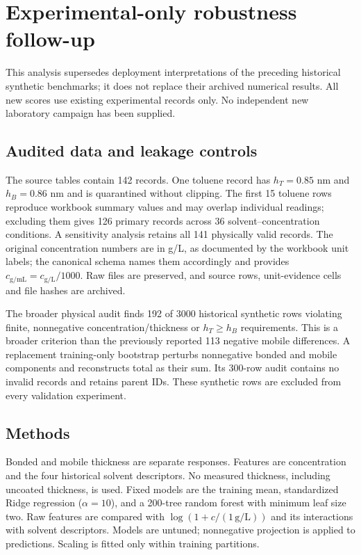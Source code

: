 \section{Experimental-only robustness follow-up}

\label{sec:robustness}

This analysis supersedes deployment interpretations of the preceding historical synthetic benchmarks; it does not replace their archived numerical results. All new scores use existing experimental records only. No independent new laboratory campaign has been supplied.

\subsection{Audited data and leakage controls}

The source tables contain 142 records. One toluene record has $h_T=0.85$ nm and $h_B=0.86$ nm and is quarantined without clipping. The first 15 toluene rows reproduce workbook summary values and may overlap individual readings; excluding them gives 126 primary records across 36 solvent--concentration conditions. A sensitivity analysis retains all 141 physically valid records. The original concentration numbers are in g/L, as documented by the workbook unit labels; the canonical schema names them accordingly and provides $c_{\mathrm{g/mL}}=c_{\mathrm{g/L}}/1000$. Raw files are preserved, and source rows, unit-evidence cells and file hashes are archived.

The broader physical audit finds 192 of 3000 historical synthetic rows violating finite, nonnegative concentration/thickness or $h_T\ge h_B$ requirements. This is a broader criterion than the previously reported 113 negative mobile differences. A replacement training-only bootstrap perturbs nonnegative bonded and mobile components and reconstructs total as their sum. Its 300-row audit contains no invalid records and retains parent IDs. These synthetic rows are excluded from every validation experiment.

\subsection{Methods}

Bonded and mobile thickness are separate responses. Features are concentration and the four historical solvent descriptors. No measured thickness, including uncoated thickness, is used. Fixed models are the training mean, standardized Ridge regression ($\alpha=10$), and a 200-tree random forest with minimum leaf size two. Raw features are compared with $\log(1+c/(1\,\mathrm{g/L}))$ and its interactions with solvent descriptors. Models are untuned; nonnegative projection is applied to predictions. Scaling is fitted only within training partitions.

